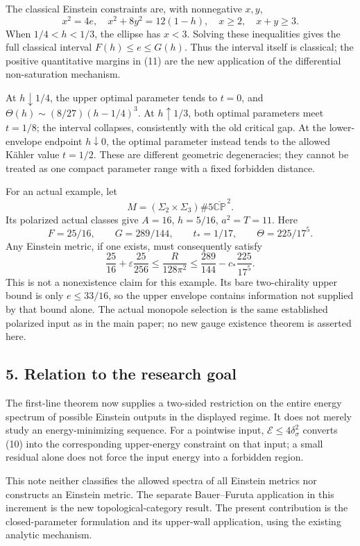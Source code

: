 \documentclass[
  11pt,
]{article}
\begin{document}
The classical Einstein constraints are, with nonnegative \(x,y\), \[
 x^2=4e,\quad x^2+8y^2=12(1-h),\quad x\ge2,\quad x+y\ge3.
\] When \(1/4<h<1/3\), the ellipse has \(x<3\). Solving these
inequalities gives the full classical interval \(F(h)\le e\le G(h)\).
Thus the interval itself is classical; the positive quantitative margins
in (11) are the new application of the differential non-saturation
mechanism.

At \(h\downarrow1/4\), the upper optimal parameter tends to \(t=0\), and
\(\Theta(h)\sim(8/27)(h-1/4)^3\). At \(h\uparrow1/3\), both optimal
parameters meet \(t=1/8\); the interval collapses, consistently with the
old critical gap. At the lower-envelope endpoint \(h\downarrow0\), the
optimal parameter instead tends to the allowed Kähler value \(t=1/2\).
These are different geometric degeneracies; they cannot be treated as
one compact parameter range with a fixed forbidden distance.

For an actual example, let \[
 M=(\Sigma_2\times\Sigma_3)\#5\overline{\mathbb{CP}}^{\,2}.
\] Its polarized actual classes give \(A=16\), \(h=5/16\), \(a^2=T=11\).
Here \[
 F=25/16,\qquad G=289/144,\qquad t_*=1/17,
 \qquad \Theta=225/17^5.
\] Any Einstein metric, if one exists, must consequently satisfy \[
 \frac{25}{16}+\varepsilon\frac{25}{256}
 \le\frac{R}{128\pi^2}
 \le\frac{289}{144}-c_*\frac{225}{17^5}.                 \tag{16}
\] This is not a nonexistence claim for this example. Its bare
two-chirality upper bound is only \(e\le33/16\), so the upper envelope
contains information not supplied by that bound alone. The actual
monopole selection is the same established polarized input as in the
main paper; no new gauge existence theorem is asserted here.

\hypertarget{relation-to-the-research-goal}{%
\subsection{5. Relation to the research
goal}\label{relation-to-the-research-goal}}

The first-line theorem now supplies a two-sided restriction on the
entire energy spectrum of possible Einstein outputs in the displayed
regime. It does not merely study an energy-minimizing sequence. For a
pointwise input, \(\mathcal E\le4\delta_\sigma^2\) converts (10) into
the corresponding upper-energy constraint on that input; a small
residual alone does not force the input energy into a forbidden region.

This note neither classifies the allowed spectra of all Einstein metrics
nor constructs an Einstein metric. The separate Bauer--Furuta
application in this increment is the new topological-category result.
The present contribution is the closed-parameter formulation and its
upper-wall application, using the existing analytic mechanism.
\end{document}

